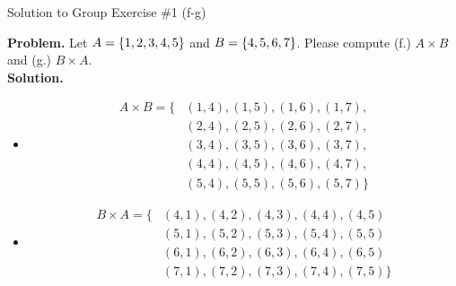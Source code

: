 \documentclass[10pt]{beamer}
\begin{document}
\begin{frame}{Solution to Group Exercise \#1 (f-g) }

\footnotesize 
\colorbox{red!30}{\textbf{Problem.}} Let $A=\{ {1,2,3,4,5} \}$ and $B=\{ {4,5,6,7} \}$. Please compute (f.) $A \times B$ and (g.)  $B \times A$.\\

\colorbox{green!30}{\textbf{Solution.}}
   \begin{itemize}
        \item[(f.)]    
        \begin{align*}
	A \times B = \bigg\{ & (1,4),(1,5),(1,6),(1,7), \\
	& (2,4),(2,5),(2,6),(2,7), \\
& (3,4),(3,5),(3,6),(3,7), \\
 & (4,4),(4,5),(4,6),(4,7), \\
& (5,4),(5,5),(5,6),(5,7)    \bigg\}    	
    \end{align*}
        \item[(g.)]    
        \begin{align*}
	B \times A = \bigg\{ & (4,1),(4,2),(4,3),(4,4), (4,5) \\
 & (5,1),(5,2),(5,3),(5,4), (5,5) \\
 & (6,1),(6,2),(6,3),(6,4), (6,5) \\
& (7,1),(7,2),(7,3),(7,4), (7,5)   \bigg\}   
    \end{align*}
    \end{itemize}
    
\end{frame}
\end{document}
